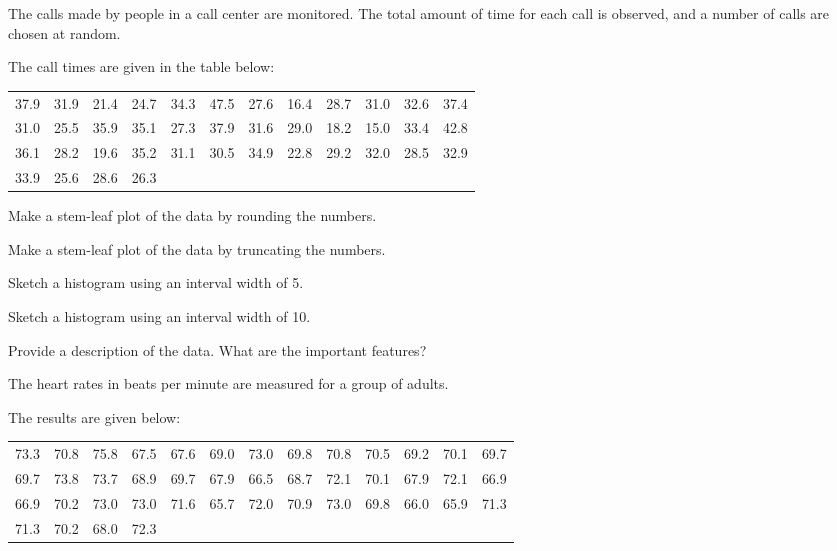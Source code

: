 
\begin{problem}
\item The calls made by people in a call center are monitored. The
  total amount of time for each call is observed, and a number of
  calls are chosen at random.

    The call times are given in the table below:\\
    \begin{tabular}{rrrrrrrrrrrr}
      37.9 & 31.9 & 21.4 & 24.7 & 34.3 & 47.5 & 27.6 & 16.4 &
      28.7 & 31.0 & 32.6 & 37.4 \\
      31.0 & 25.5 & 35.9 & 35.1 & 27.3 & 37.9 & 31.6 & 29.0 &
      18.2 & 15.0 & 33.4 & 42.8  \\
      36.1 & 28.2 & 19.6 & 35.2 & 31.1 & 30.5 & 34.9 & 22.8 &
      29.2 & 32.0 & 28.5 & 32.9 \\
      33.9 & 25.6 & 28.6 & 26.3
    \end{tabular}
    
    \begin{subproblem}
      \item Make a stem-leaf plot of the data by rounding the numbers.
        \vfill
      \item Make a stem-leaf plot of the data by truncating the
        numbers.
        \vfill
        \clearpage
      \item Sketch a histogram using an interval width of 5.
        \vfill
      \item Sketch a histogram using an interval width of 10.
        \vfill
      \item Provide a description of the data. What are the important features?
        \vspace{5em}
    \end{subproblem}

\clearpage

  \item The heart rates in beats per minute are measured for a group
    of adults. 

    The results are given below:\\
    \begin{tabular}{rrrrrrrrrrrrr}
      73.3 & 70.8 & 75.8 & 67.5 & 67.6 & 69.0 & 73.0 & 69.8 & 70.8 & 70.5 & 69.2 & 70.1 & 69.7 \\
      69.7 & 73.8 & 73.7 & 68.9 & 69.7 & 67.9 & 66.5 & 68.7 & 72.1 & 70.1 & 67.9 & 72.1 & 66.9 \\
      66.9 & 70.2 & 73.0 & 73.0 & 71.6 & 65.7 & 72.0 & 70.9 & 73.0 & 69.8 & 66.0 & 65.9 & 71.3 \\
      71.3 & 70.2 & 68.0 & 72.3 
    \end{tabular}
    

\end{problem}
